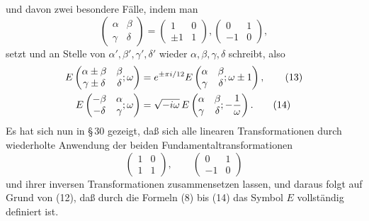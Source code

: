 \documentclass[11pt]{article}
\begin{document}
und davon zwei besondere Fälle, indem man
\[
\begin{pmatrix}\alpha&\beta\\ \gamma&\delta\end{pmatrix}
=\begin{pmatrix}1&0\\ \pm1&1\end{pmatrix},
\begin{pmatrix}0&1\\-1&0\end{pmatrix},
\]
setzt und an Stelle von $\alpha\prime,\beta\prime,\gamma\prime,\delta\prime$ wieder $\alpha,\beta,\gamma,\delta$ schreibt, also
\begin{align}
E\left(\begin{matrix}\alpha\pm\beta&\beta\\ \gamma\pm\delta&\delta\end{matrix};\omega\right)&=
 e^{\pm\pi i/12}E\left(\begin{matrix}\alpha&\beta\\ \gamma&\delta\end{matrix};\omega\pm1\right), \tag{13}\\
E\left(\begin{matrix}-\beta&\alpha\\ -\delta&\gamma\end{matrix};\omega\right)&=
 \sqrt{-i\omega}\,E\left(\begin{matrix}\alpha&\beta\\ \gamma&\delta\end{matrix};-{1\over\omega}\right). \tag{14}
\end{align}
Es hat sich nun in \S\,30 gezeigt, daß sich alle linearen Transformationen durch wiederholte Anwendung der beiden Fundamentaltransformationen
\[
\begin{pmatrix}1&0\\1&1\end{pmatrix},
\qquad
\begin{pmatrix}0&1\\-1&0\end{pmatrix}
\]
und ihrer inversen Transformationen zusammensetzen lassen, und daraus folgt auf Grund von (12), daß durch die Formeln (8) bis (14) das Symbol $E$ vollständig definiert ist.
\end{document}
